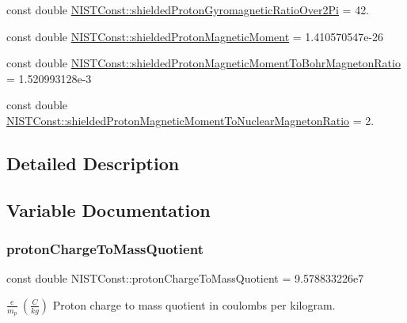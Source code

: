 \begin{DoxyCompactItemize}
const double \mbox{\hyperlink{group___n_i_s_t_const-_proton_ga5b2d223ede8fc141af04cef0486c2c52}{N\+I\+S\+T\+Const\+::shielded\+Proton\+Gyromagnetic\+Ratio\+Over2\+Pi}} = 42.
\item 
const double \mbox{\hyperlink{group___n_i_s_t_const-_proton_ga3e2c09881642d47d3e869c7803862e6f}{N\+I\+S\+T\+Const\+::shielded\+Proton\+Magnetic\+Moment}} = 1.\+410570547e-\/26
\item 
const double \mbox{\hyperlink{group___n_i_s_t_const-_proton_ga175eb518370bc31471e8ad763e760b72}{N\+I\+S\+T\+Const\+::shielded\+Proton\+Magnetic\+Moment\+To\+Bohr\+Magneton\+Ratio}} = 1.\+520993128e-\/3
\item 
const double \mbox{\hyperlink{group___n_i_s_t_const-_proton_ga03e84ef0d1452fa7c647f8866913fbc3}{N\+I\+S\+T\+Const\+::shielded\+Proton\+Magnetic\+Moment\+To\+Nuclear\+Magneton\+Ratio}} = 2.
\end{DoxyCompactItemize}


\subsection{Detailed Description}


\subsection{Variable Documentation}
\mbox{\label{group___n_i_s_t_const-_proton_ga59d127bca4ef5416e0e42c4d05c35a68}} 
\subsubsection{\texorpdfstring{proton\+Charge\+To\+Mass\+Quotient}{protonChargeToMassQuotient}}
{\footnotesize\ttfamily const double N\+I\+S\+T\+Const\+::proton\+Charge\+To\+Mass\+Quotient = 9.\+578833226e7}

$\frac{e}{m_p} \ (\frac{C}{kg})$ Proton charge to mass quotient in coulombs per kilogram. \mbox{\label{group___n_i_s_t_const-_proton_ga79247734bd6f7409a382e17da7359680}} 
